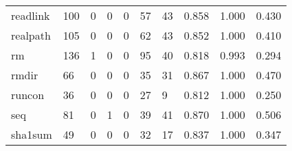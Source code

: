\begin{longtable}{lp{2.0cm}p{2.0cm}p{2.0cm}p{2.0cm}p{2.0cm}p{2.0cm}p{2.0cm}p{2.0cm}p{2.0cm}}
readlink  &                    100 &                                             0 &                                            0 &                                           0 &                                           57 &                                         43 &                                0.858 &                                  1.000 &                                0.430 \\
realpath  &                    105 &                                             0 &                                            0 &                                           0 &                                           62 &                                         43 &                                0.852 &                                  1.000 &                                0.410 \\
rm        &                    136 &                                             1 &                                            0 &                                           0 &                                           95 &                                         40 &                                0.818 &                                  0.993 &                                0.294 \\
rmdir     &                     66 &                                             0 &                                            0 &                                           0 &                                           35 &                                         31 &                                0.867 &                                  1.000 &                                0.470 \\
runcon    &                     36 &                                             0 &                                            0 &                                           0 &                                           27 &                                          9 &                                0.812 &                                  1.000 &                                0.250 \\
seq       &                     81 &                                             0 &                                            1 &                                           0 &                                           39 &                                         41 &                                0.870 &                                  1.000 &                                0.506 \\
sha1sum   &                     49 &                                             0 &                                            0 &                                           0 &                                           32 &                                         17 &                                0.837 &                                  1.000 &                                0.347 \\

\end{longtable}
